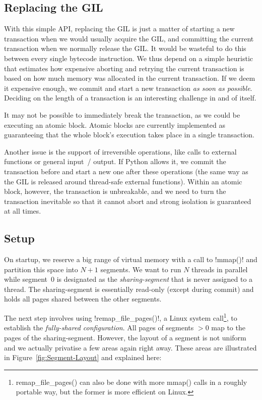 \documentclass{sigplanconf}
\makeatletter
\renewcommand\lstinline[1][]{%
  \Collectverb{\@@myverb}%
}
\def\@@myverb#1{%
    \begingroup
    \fboxsep=0.2em
    \colorbox{verylightgray}{\oldlstinline|#1|}%
    \endgroup
}
\makeatother
\begin{document}
\subsection{Replacing the GIL}

With this simple API, replacing the GIL is just a matter of starting a
new transaction when we would usually acquire the GIL, and committing
the current transaction when we normally release the GIL.  It would be
wasteful to do this between every single bytecode instruction.  We
thus depend on a simple heuristic that estimates how expensive
aborting and retrying the current transaction is based on how much
memory was allocated in the current transaction. If we deem it
expensive enough, we commit and start a new transaction \emph{as soon
as possible}. Deciding on the length of a transaction is an
interesting challenge in and of itself.

It may not be possible to immediately break the transaction, as we
could be executing an atomic block. Atomic blocks are currently
implemented as guaranteeing that the whole block's execution takes
place in a single transaction.

Another issue is the support of
irreversible operations, like calls to external functions or general
input~/ output. If Python allows it, we commit the transaction before
and start a new one after these operations (the same way as the GIL is
released around thread-safe external functions). Within an atomic
block, however, the transaction is unbreakable, and we need to turn
the transaction inevitable so that it cannot abort and strong
isolation is guaranteed at all times.



\subsection{Setup\label{sub:Setup}}

On startup, we reserve a big range of virtual memory with a call to
\lstinline!mmap()! and partition this space into $N+1$ segments.
We want to run $N$ threads in parallel while segment~0 is designated as
the \emph{sharing-segment} that is never assigned to a thread. The
sharing-segment is essentially read-only (except during commit) and
holds all pages shared between the other segments.

The next step involves using \lstinline!remap_file_pages()!, a Linux
system call\footnote{remap\_file\_pages() can also be done with more mmap()
calls in a roughly portable way, but the former is more efficient on Linux.},
to establish the \emph{fully-shared configuration}.  All pages
of segments $>0$ map to the pages of the sharing-segment.
However, the layout of a segment is not uniform and we actually
privatise a few areas again right away. These areas are illustrated in
Figure~\ref{fig:Segment-Layout} and explained here:
\end{document}
